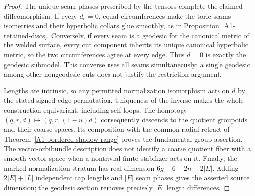 \begin{proof}
The unique seam phases prescribed by the tensors complete the
claimed diffeomorphism. If every $d_e=0$, equal circumferences
make the toric seams isometries and their hyperbolic collars glue
smoothly, as in Proposition~\ref{A1-retained-discs}. Conversely,
if every seam is a geodesic for the canonical metric of the welded
surface, every cut component inherits its unique canonical
hyperbolic metric, so the two circumferences agree at every edge.
Thus $d=0$ is exactly the geodesic submodel. This converse uses
all seams simultaneously; a single geodesic among other
nongeodesic cuts does not justify the restriction argument.

Lengths are intrinsic, so any permitted normalization isomorphism
acts on $d$ by the stated signed edge permutation. Uniqueness of
the inverse makes the whole construction equivariant, including
self-loops. The homotopy $(q,r,d)\mapsto(q,r,(1-u)d)$ consequently
descends to the quotient groupoids and their coarse spaces. Its
composition with the common radial retract of
Theorem~\ref{A1-bordered-shadow-range} proves the
fundamental-group assertion. The vector-orbibundle description
does not identify a coarse quotient fiber with a smooth vector
space when a nontrivial finite stabilizer acts on it.
Finally, the marked normalization stratum has real dimension
$6g-6+2n-2|E|$. Adding $2|E|+|L|$ independent cap lengths and
$|E|$ seam phases gives the asserted source dimension; the
geodesic section removes precisely $|E|$ length differences.
\end{proof}

